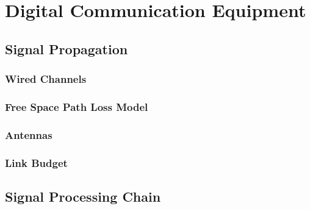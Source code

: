 %
%
%

\chapter{Digital Communication Equipment}

\begin{refsection}

\section{Signal Propagation}

\subsection{Wired Channels}

\subsection{Free Space Path Loss Model}


\subsection{Antennas}

\subsection{Link Budget}


\section{Signal Processing Chain}


{}
\printbibliography[heading=subbibliography]
\end{refsection}

